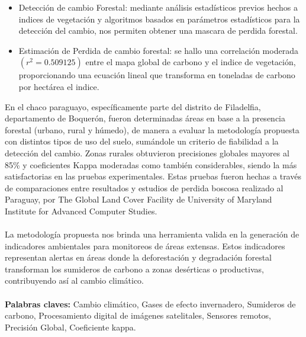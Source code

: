 \documentclass[11pt, a4paper, oneside]{Thesis} %
\begin{document}
{\begin{itemize}
	\item Detecci\'on de cambio Forestal: mediante an\'alisis estad\'isticos previos hechos a indices de vegetaci\'on y algoritmos basados en par\'ametros estad\'isticos para la detecci\'on del cambio, nos permiten obtener una mascara de perdida forestal.
	\item Estimaci\'on de Perdida de cambio forestal: se hallo una correlaci\'on moderada $ (r^{2}=0.509125) $ entre el mapa global de carbono y el indice de vegetaci\'on, proporcionando una ecuaci\'on lineal que transforma en toneladas de carbono por hect\'area el indice.
\end{itemize}
En el chaco paraguayo, espec\'ificamente parte del distrito de Filadelfia, departamento de Boquer\'on, fueron determinadas \'areas en base a la presencia forestal (urbano, rural y h\'umedo), de manera a evaluar la metodolog\'ia propuesta con distintos tipos de uso del suelo, sum\'andole un criterio de fiabilidad a la detecci\'on del cambio. Zonas rurales obtuvieron precisiones globales mayores al 85\% y coeficientes Kappa moderadas como tambi\'en considerables, siendo la m\'as satisfactorias en las pruebas experimentales. Estas pruebas fueron hechas a trav\'es de comparaciones entre resultados y estudios de perdida boscosa realizado al Paraguay, por The Global Land Cover Facility de University of Maryland Institute for Advanced Computer Studies.\\~\\
La metodolog\'ia propuesta nos brinda una herramienta valida en la generaci\'on de indicadores ambientales para monitoreos de \'areas extensas. Estos indicadores representan  alertas en \'areas donde la deforestaci\'on y degradaci\'on forestal transforman los sumideros de carbono a zonas des\'erticas o productivas, contribuyendo as\'i al cambio clim\'atico. \\~\\
\textbf{ Palabras claves: } Cambio clim\'atico, Gases de efecto invernadero, Sumideros de carbono, Procesamiento digital de im\'agenes satelitales, Sensores remotos, Precisi\'on Global, Coeficiente kappa. 
 




\clearpage %
}
\end{document}
